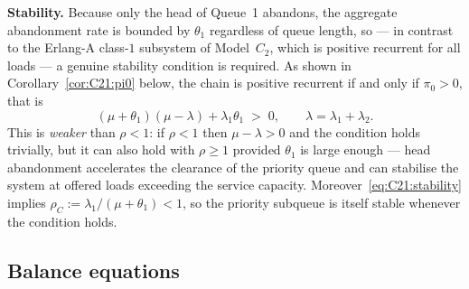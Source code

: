 \textbf{Stability.} Because only the head of Queue~1 abandons, the aggregate abandonment
rate is bounded by $\theta_1$ regardless of queue length, so --- in contrast to the Erlang-A
class-$1$ subsystem of Model~$C_2$, which is positive recurrent for all loads --- a genuine
stability condition is required. As shown in Corollary~\ref{cor:C21:pi0} below, the chain is
positive recurrent if and only if $\pi_0>0$, that is
\begin{equation}
    (\mu+\theta_1)(\mu-\lambda) + \lambda_1\theta_1 \;>\; 0,
    \qquad \lambda=\lambda_1+\lambda_2.
    \label{eq:C21:stability}
\end{equation}
This is \emph{weaker} than $\rho<1$: if $\rho<1$ then $\mu-\lambda>0$ and the condition holds
trivially, but it can also hold with $\rho\ge1$ provided $\theta_1$ is large enough --- head
abandonment accelerates the clearance of the priority queue and can stabilise the system at
offered loads exceeding the service capacity. Moreover~\eqref{eq:C21:stability} implies
$\rho_C:=\lambda_1/(\mu+\theta_1)<1$, so the priority subqueue is itself stable whenever the
condition holds.

\subsection{Balance equations}

